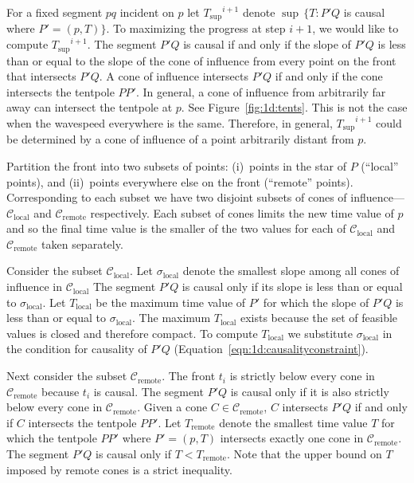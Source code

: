\documentclass[twocolumn]{article}
\def\S{\ensuremath{\sigma}}
\def\supT{\ensuremath{T_{\text{sup}}}}
\def\fp{\ensuremath{P}}
\def\fq{\ensuremath{Q}}
\begin{document}
For a fixed segment $pq$ incident on $p$ let $\supT^{i+1}$ denote
$\sup \, \{ T : \fp'\fq$ is causal where $\fp'=(p,T) \}$.  To
maximizing the progress at step $i+1$, we would like to compute
$\supT^{i+1}$.  The segment $\fp'\fq$ is causal if and only if the
slope of $\fp'\fq$ is less than or equal to the slope of the cone of
influence from every point on the front that intersects $\fp'\fq$.  A
cone of influence intersects $\fp'\fq$ if and only if the cone
intersects the tentpole $\fp\fp'$.  In general, a cone of influence
from arbitrarily far away can intersect the tentpole at $p$. See
Figure~\ref{fig:1d:tents}.  This is not the case when the wavespeed
everywhere is the same.  Therefore, in general, $\supT^{i+1}$ could be
determined by a cone of influence of a point arbitrarily distant from
$p$.

Partition the front into two subsets of points: (i)~points in the star
of $\fp$ (``local'' points), and (ii)~points everywhere else on the
front (``remote'' points).  Corresponding to each subset we have two
disjoint subsets of cones of influence---$\mathcal{C}_{\text{local}}$
and $\mathcal{C}_{\text{remote}}$ respectively.  Each subset of cones
limits the new time value of $p$ and so the final time value is the
smaller of the two values for each of $\mathcal{C}_{\text{local}}$ and
$\mathcal{C}_{\text{remote}}$ taken separately.

Consider the subset $\mathcal{C}_{\text{local}}$.  Let
$\S_{\text{local}}$ denote the smallest slope among all cones of
influence in $\mathcal{C}_{\text{local}}$ The segment $\fp'\fq$ is
causal only if its slope is less than or equal to $\S_{\text{local}}$.
Let $T_{\text{local}}$ be the maximum time value of $\fp'$ for which
the slope of $\fp'\fq$ is less than or equal to $\S_{\text{local}}$.
The maximum $T_{\text{local}}$ exists because the set of feasible
values is closed and therefore compact.  To compute $T_{\text{local}}$
we substitute $\S_{\text{local}}$ in the condition for causality of
$\fp'\fq$ (Equation~\ref{eqn:1d:causalityconstraint}).

Next consider the subset $\mathcal{C}_{\text{remote}}$.  The front
$t_i$ is strictly below every cone in $\mathcal{C}_{\text{remote}}$
because $t_i$ is causal.  The segment $\fp'\fq$ is causal only if it
is also strictly below every cone in $\mathcal{C}_{\text{remote}}$.
Given a cone $C \in \mathcal{C}_{\text{remote}}$, $C$ intersects
$\fp'\fq$ if and only if $C$ intersects the tentpole $\fp\fp'$.  Let
$T_{\text{remote}}$ denote the smallest time value $T$ for which the
tentpole $\fp\fp'$ where $\fp'=(p,T)$ intersects exactly one cone in
$\mathcal{C}_{\text{remote}}$.    The segment $\fp'\fq$ is causal only
if $T < T_{\text{remote}}$.  Note that the upper bound on $T$ imposed
by remote cones is a strict inequality.
\end{document}
